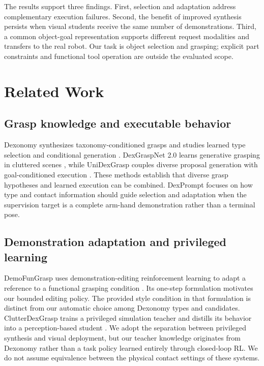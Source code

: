 \documentclass[letterpaper,10pt,conference]{ieeeconf}
\begin{document}
The results support three findings. First, selection and adaptation address complementary execution failures. Second, the benefit of improved synthesis persists when visual students receive the same number of demonstrations. Third, a common object-goal representation supports different request modalities and transfers to the real robot. Our task is object selection and grasping; explicit part constraints and functional tool operation are outside the evaluated scope.

\section{Related Work}
\subsection{Grasp knowledge and executable behavior}
Dexonomy synthesizes taxonomy-conditioned grasps and studies learned type selection and conditional generation \cite{dexonomy}. DexGraspNet 2.0 learns generative grasping in cluttered scenes \cite{dexgraspnet2}, while UniDexGrasp couples diverse proposal generation with goal-conditioned execution \cite{unidexgrasp}. These methods establish that diverse grasp hypotheses and learned execution can be combined. DexPrompt focuses on how type and contact information should guide selection and adaptation when the supervision target is a complete arm-hand demonstration rather than a terminal pose.

\subsection{Demonstration adaptation and privileged learning}
DemoFunGrasp uses demonstration-editing reinforcement learning to adapt a reference to a functional grasping condition \cite{demofungrasp}. Its one-step formulation motivates our bounded editing policy. The provided style condition in that formulation is distinct from our automatic choice among Dexonomy types and candidates. ClutterDexGrasp trains a privileged simulation teacher and distills its behavior into a perception-based student \cite{clutterdexgrasp}. We adopt the separation between privileged synthesis and visual deployment, but our teacher knowledge originates from Dexonomy rather than a task policy learned entirely through closed-loop RL. We do not assume equivalence between the physical contact settings of these systems.
\end{document}
